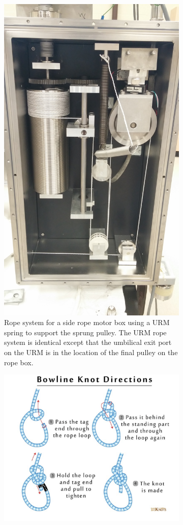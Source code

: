 \documentclass[11pt]{article}
\begin{document}
\begin{figure}
  \begin{center}
\begin{subfigure}{0.4\textwidth}
  \includegraphics[height=\textwidth,angle=270]{RopeSystemMB}
  \caption{Rope system for a side rope motor box using a URM spring to support the sprung pulley. The URM rope system is identical except that the umbilical exit port on the URM is in the location of the final pulley on the rope box.}
  \label{fig:ropeSystem}
\end{subfigure}
\begin{subfigure}{0.5\textwidth}
  \includegraphics[width=\textwidth]{BowlineKnotDirections}

\end{subfigure}
\end{center}
\end{figure}
\end{document}
